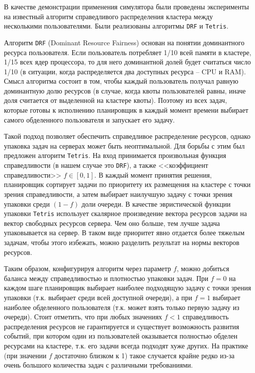 В качестве демонстрации применения симулятора были проведены эксперименты на известный алгоритм справедливого распределения кластера между несколькими пользователями. Были реализованы алгоритмы \texttt{DRF}\cite{drf-article} и \texttt{Tetris}\cite{tetris-article}. 

Алгоритм \texttt{DRF} (Dominant Resource Fairness) основан на понятии доминантного ресурса пользователя. Если пользователь потребляет 1/10 всей памяти в кластере, 1/15 всех ядер процессора, то для него доминантной долей будет считаться число 1/10 (в ситуации, когда распределяется два доступных ресурса -- CPU и RAM). Смысл алгоритма состоит в том, чтобы каждый пользователь получал равную доминантную долю ресурсов (в случае, когда квоты пользователей равны, иначе доля считается от выделенной на кластере квоты). Поэтому из всех задач, которые готовы к исполнению планировщик в каждый момент времени выбирает самого обделенного пользователя и запускает его задачу. 

Такой подход позволяет обеспечить справедливое распределение ресурсов, однако упаковка задач на серверах может быть неоптимальной. Для борьбы с этим был предложен алгоритм \texttt{Tetris}\cite{tetris-article}. На вход принимается произвольная функция справедливости (в нашем случае это \texttt{DRF}), а также <<коэффициент справедливости>> $f \in [0, 1]$. В каждый момент принятия решения, планировщик сортирует задачи по приоритету их размещения на кластере с точки зрения справедливости, а затем выбирает наилучшую задачу с точки зрения упаковки среди $(1 - f)$ доли очереди. В качестве эвристической функции упаковки \texttt{Tetris} использует скалярное произведение вектора ресурсов задачи на вектор свободных ресурсов сервера. Чем оно больше, тем лучше задача упаковывается на сервер. В таком виде приоритет явно отдается более тяжелым задачам, чтобы этого избежать, можно разделить результат на нормы векторов ресурсов. 

Таким образом, конфигурируя алгоритм через параметр $f$, можно добиться баланса между справедливостью и плотностью упаковки задач. При $f = 0$ на каждом шаге планировщик выбирает наиболее подходящую задачу с точки зрения упаковки (т.к. выбирает среди всей доступной очереди), а при $f = 1$ выбирает наиболее обделенного пользователя (т.к. может взять только первую задачу из очереди). Стоит отметить, что при любых значениях $f < 1$ справедливость распределения ресурсов не гарантируется и существует возможность развития событий, при котором один из пользователей оказывается полностью обделен ресурсами на кластере, т.к. его задачи всегда подходят хуже других. На практике (при значении $f$ достаточно близком к 1) такое случается крайне редко из-за очень большого количества задач с различными требованиями. 


